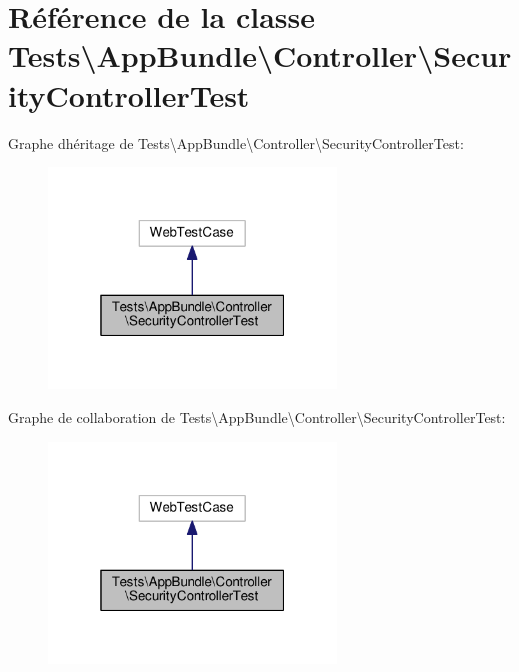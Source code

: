 \hypertarget{classTests_1_1AppBundle_1_1Controller_1_1SecurityControllerTest}{}\section{Référence de la classe Tests\textbackslash{}App\+Bundle\textbackslash{}Controller\textbackslash{}Security\+Controller\+Test}
\label{classTests_1_1AppBundle_1_1Controller_1_1SecurityControllerTest}


Graphe d\textquotesingle{}héritage de Tests\textbackslash{}App\+Bundle\textbackslash{}Controller\textbackslash{}Security\+Controller\+Test\+:\nopagebreak
\begin{figure}[H]
\begin{center}
\leavevmode
\includegraphics[width=217pt]{classTests_1_1AppBundle_1_1Controller_1_1SecurityControllerTest__inherit__graph}
\end{center}
\end{figure}


Graphe de collaboration de Tests\textbackslash{}App\+Bundle\textbackslash{}Controller\textbackslash{}Security\+Controller\+Test\+:\nopagebreak
\begin{figure}[H]
\begin{center}
\leavevmode
\includegraphics[width=217pt]{classTests_1_1AppBundle_1_1Controller_1_1SecurityControllerTest__coll__graph}
\end{center}
\end{figure}
